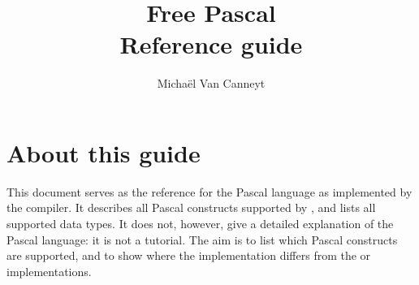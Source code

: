 %
%
%
%
%

\begin{latexonly}
  \ifpdf
  \fi
\end{latexonly}

%
%
\makeindex
%
%
\usepackage{syntax}

%
%

\title{Free Pascal\\ Reference guide}

\author{Micha\"el Van Canneyt}
\maketitle
\tableofcontents
\newpage
\listoftables
\newpage




\section*{About this guide}
This document serves as the reference for the Pascal language as implemented
by the \fpc compiler. It describes all Pascal constructs supported by
\fpc, and lists all supported data types. It does not, however, give a
detailed explanation of the Pascal language: it is not a tutorial.
The aim is to list which Pascal constructs are supported, and to show
where the \fpc implementation differs from the \tp or \delphi
implementations.

